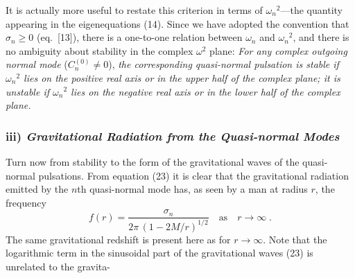 It is actually more useful to restate this criterion in terms of $\omega_n{}^2$---the quantity appearing in the eigenequations (14). Since we have adopted the convention that $\sigma_n \geq 0$
(eq.\ [13]), there is a one-to-one relation between $\omega_n$ and $\omega_n{}^2$, and there is no ambiguity
about stability in the complex $\omega^2$ plane: \textit{For any complex outgoing normal mode} ($C_n^{(0)} \neq 0$),
\textit{the corresponding quasi-normal pulsation is stable if $\omega_n{}^2$ lies on the positive real axis
or in the upper half of the complex plane; it is unstable if $\omega_n{}^2$ lies on the negative real axis
or in the lower half of the complex plane.}

\subsubsection*{iii) \textit{Gravitational Radiation from the Quasi-normal Modes}}

Turn now from stability to the form of the gravitational waves of the quasi-normal
pulsations. From equation (23) it is clear that the gravitational radiation emitted by
the $n$th quasi-normal mode has, as seen by a man at radius $r$, the frequency
\begin{equation}
  f(r) = \frac{\sigma_n}{2\pi\,(1 - 2M/r)^{1/2}}
         \quad \text{as} \quad r \to \infty \;.
\label{eq:24}
\end{equation}
The same gravitational redshift is present here as for $r \to \infty$. Note that the logarithmic
term in the sinusoidal part of the gravitational waves (23) is unrelated to the gravita-
